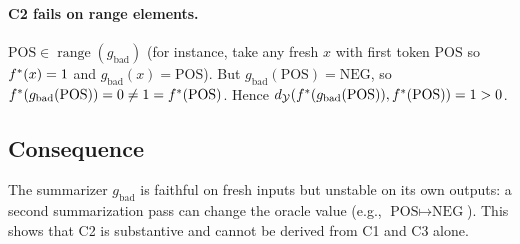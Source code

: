 \paragraph{C2 fails on range elements.}
$\text{POS} \in \operatorname{range}(g_{\mathrm{bad}})$ (for instance, take any fresh $x$ with first token $\text{POS}$ so $f^\ast(x)=1$ and $g_{\mathrm{bad}}(x)=\text{POS}$). But $g_{\mathrm{bad}}(\text{POS})=\text{NEG}$, so $f^\ast(g_{\mathrm{bad}}(\text{POS}))=0\neq 1=f^\ast(\text{POS})$. Hence $d_{\mathcal{Y}}(f^\ast(g_{\mathrm{bad}}(\text{POS})), f^\ast(\text{POS})) = 1 > 0$.

\subsection{Consequence}

The summarizer $g_{\mathrm{bad}}$ is faithful on fresh inputs but unstable on its own outputs: a second summarization pass can change the oracle value (e.g., $\text{POS} \mapsto \text{NEG}$). This shows that C2 is substantive and cannot be derived from C1 and C3 alone.
